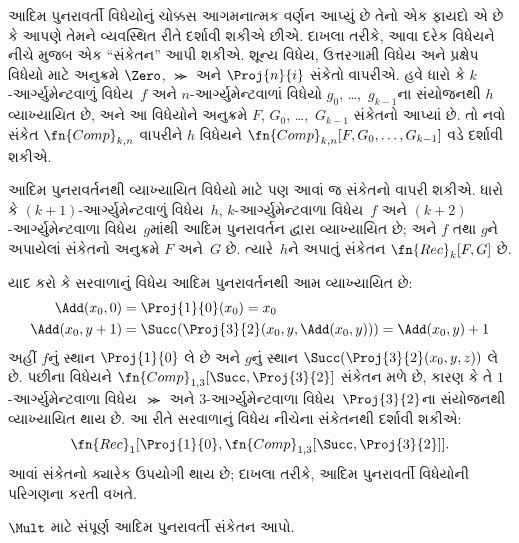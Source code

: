 \documentclass[../../../include/open-logic-section]{subfiles}
\begin{document}

આદિમ પુનરાવર્તી વિધેયોનું ચોક્કસ આગમનાત્મક વર્ણન આપ્યું છે તેનો એક
ફાયદો એ છે કે આપણે તેમને વ્યવસ્થિત રીતે દર્શાવી શકીએ છીએ.
દાખલા તરીકે, આવા દરેક વિધેયને નીચે મુજબ એક ``સંકેતન'' આપી શકીએ.
શૂન્ય વિધેય, ઉત્તરગામી વિધેય અને પ્રક્ષેપ વિધેયો માટે અનુક્રમે
$\Zero$, $\Succ$ અને $\Proj{n}{i}$ સંકેતો વાપરીએ. હવે ધારો કે
$k$-આર્ગ્યુમેન્ટવાળું વિધેય~$f$ અને $n$-આર્ગ્યુમેન્ટવાળાં વિધેયો
$g_0$, \dots,~$g_{k-1}$ના સંયોજનથી $h$ વ્યાખ્યાયિત છે, અને આ
વિધેયોને અનુક્રમે $F$, $G_0$, \dots,~$G_{k-1}$ સંકેતનો આપ્યાં છે.
તો નવો સંકેત $\fn{Comp}_{k,n}$ વાપરીને $h$ વિધેયને
$\fn{Comp}_{k,n}[F,G_0,\dots,G_{k-1}]$ વડે દર્શાવી શકીએ.

આદિમ પુનરાવર્તનથી વ્યાખ્યાયિત વિધેયો માટે પણ આવાં જ સંકેતનો
વાપરી શકીએ. ધારો કે $(k+1)$-આર્ગ્યુમેન્ટવાળું વિધેય~$h$,
$k$-આર્ગ્યુમેન્ટવાળા વિધેય~$f$ અને $(k+2)$-આર્ગ્યુમેન્ટવાળા
વિધેય~$g$માંથી આદિમ પુનરાવર્તન દ્વારા વ્યાખ્યાયિત છે; અને $f$ તથા
$g$ને અપાયેલાં સંકેતનો અનુક્રમે $F$ અને~$G$ છે. ત્યારે~$h$ને
અપાતું સંકેતન $\fn{Rec}_k[F,G]$ છે.

યાદ કરો કે સરવાળાનું વિધેય આદિમ પુનરાવર્તનથી આમ વ્યાખ્યાયિત છે:
\begin{align*}
  \Add(x_0, 0) & = \Proj{1}{0}(x_0) = x_0\\
  \Add(x_0, y+1) & = \Succ(\Proj{3}{2}(x_0, y, \Add(x_0, y))) = \Add(x_0, y) +1
\end{align*}
અહીં $f$નું સ્થાન $\Proj{1}{0}$ લે છે અને $g$નું સ્થાન
$\Succ(\Proj{3}{2}(x_0, y, z))$ લે છે. પછીના વિધેયને
$\fn{Comp}_{1,3}[\Succ,\Proj{3}{2}]$ સંકેતન મળે છે, કારણ કે તે
$1$-આર્ગ્યુમેન્ટવાળા વિધેય~$\Succ$ અને
$3$-આર્ગ્યુમેન્ટવાળા વિધેય~$\Proj{3}{2}$ના સંયોજનથી વ્યાખ્યાયિત
થાય છે. આ રીતે સરવાળાનું વિધેય નીચેના સંકેતનથી દર્શાવી શકીએ:
\[
\fn{Rec}_1[\Proj{1}{0},\fn{Comp}_{1,3}[\Succ,\Proj{3}{2}]].
\]
આવાં સંકેતનો ક્યારેક ઉપયોગી થાય છે; દાખલા તરીકે, આદિમ પુનરાવર્તી
વિધેયોની પરિગણના કરતી વખતે.

\begin{prob}
  $\Mult$ માટે સંપૂર્ણ આદિમ પુનરાવર્તી સંકેતન આપો.
\end{prob}
\end{document}
